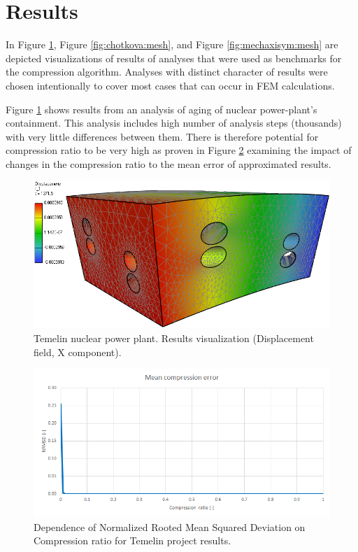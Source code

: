 \section{Results}
\label{sec:results}

In Figure \ref{fig:temelin:mesh}, Figure \ref{fig:chotkova:mesh}, and Figure \ref{fig:mechaxisym:mesh} are depicted visualizations of results of analyses that were used as benchmarks for the compression algorithm. Analyses with distinct character of results were chosen intentionally to cover most cases that can occur in FEM calculations.

Figure \ref{fig:temelin:mesh} shows results from an analysis of aging of nuclear power-plant's containment. This analysis includes high number of analysis steps (thousands) with very little differences between them. There is therefore potential for compression ratio to be very high as proven in Figure \ref{fig:temelin:NRMSD} examining the impact of changes in the compression ratio to the mean error of approximated results.

\begin{figure}[H]
\centering\includegraphics[width=\textwidth]{figures/temelin_screenshot}
\caption{Temelin nuclear power plant. Results visualization (Displacement field, X component).}
\label{fig:temelin:mesh}
\end{figure}

\begin{figure}[H]
\centering\includegraphics[width=\textwidth]{figures/temelin_NRMSD}
\caption{Dependence of Normalized Rooted Mean Squared Deviation on Compression ratio for Temelin project results.}
\label{fig:temelin:NRMSD}
\end{figure}

